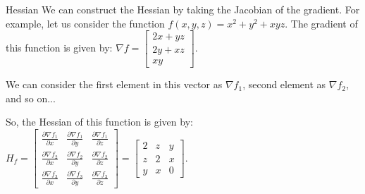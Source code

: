 \documentclass{beamer}
\begin{document}
\begin{frame}{Hessian}
    We can construct the Hessian by taking the Jacobian of the gradient.
    For example, let us consider the function $f(x, y, z) = x^2 + y^2 + xyz$.
    The gradient of this function is given by: $\nabla f = \begin{bmatrix} 2x + yz \\ 2y + xz \\ xy\end{bmatrix}$.

    We can consider the first element in this vector as $\nabla f_1$, second element as $\nabla f_2$, and so on...

    So, the Hessian of this function is given by:
    $H_f = \begin{bmatrix} \frac{\partial \nabla f_1}{\partial x} & \frac{\partial \nabla f_1}{\partial y} & \frac{\partial \nabla f_1}{\partial z} \\
            \frac{\partial \nabla f_2}{\partial x} & \frac{\partial \nabla f_2}{\partial y} & \frac{\partial \nabla f_2}{\partial z} \\
            \frac{\partial \nabla f_3}{\partial x} & \frac{\partial \nabla f_3}{\partial y} & \frac{\partial \nabla f_3}{\partial z}\end{bmatrix}
        =\begin{bmatrix} 2 & z & y\\ z & 2 & x \\ y & x & 0\end{bmatrix}$.


\end{frame}
\end{document}
